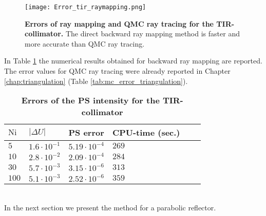 \begin{figure}[t]
  \begin{center}
  \texttt{[image: Error\_tir\_raymapping.png]}
  \end{center}
  \caption{\textbf{Errors of ray mapping and QMC ray tracing for the TIR-collimator.}
 The direct backward ray mapping method is faster and more accurate than QMC ray tracing.}
\label{fig:error_tir_raymapping}
 \end{figure}
In Table \ref{tab:ray_mapping_tir} the numerical results obtained for backward ray mapping are reported. The error values for QMC ray tracing were already reported in Chapter \ref{chap:triangulation} (Table \ref{tab:mc_error_triangulation}).
\begin{table}[t] 
\centering
\caption{\bf Errors of the PS intensity for the TIR-collimator}
\begin{tabular}{llllll}
 \hline  $\textrm{Ni}$\; & $|\Delta U|$  & PS error & CPU-time (sec.)\\
  \hline 
 $5$    & $1.6\cdot 10^{-1}$   & $5.19\cdot10^{-4}$     & $269$  \\
$10$    & $2.8\cdot 10^{-2}$ & $2.09\cdot 10^{-4}$   & $284$   \\
$30$   & $5.7 \cdot 10^{-3}$ & $3.15\cdot 10^{-6}$   & $313$  \\
$100$  & $5.1 \cdot 10^{-3}$ & $2.52\cdot 10^{-6}$   & $359$  \\
 \hline
 \end{tabular}
 \label{tab:ray_mapping_tir}
 \end{table}
\\ \indent In the next section we present the method for a parabolic reflector.
